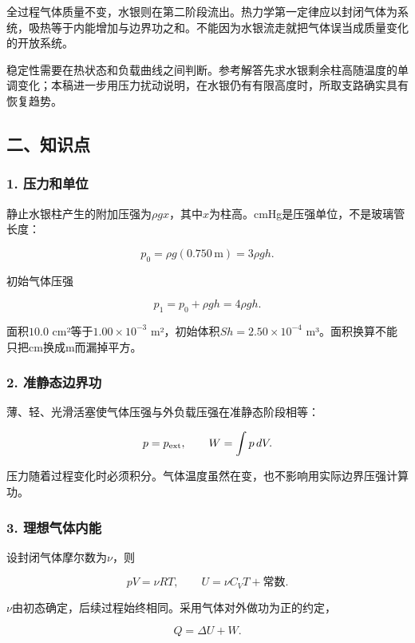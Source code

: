 \documentclass[12pt,a4paper,fontset=fandol]{ctexart}
\begin{document}
全过程气体质量不变，水银则在第二阶段流出。热力学第一定律应以封闭气体为系统，吸热等于内能增加与边界功之和。不能因为水银流走就把气体误当成质量变化的开放系统。

稳定性需要在热状态和负载曲线之间判断。参考解答先求水银剩余柱高随温度的单调变化；本稿进一步用压力扰动说明，在水银仍有有限高度时，所取支路确实具有恢复趋势。

\subsection{二、知识点}\label{ux4e8cux77e5ux8bc6ux70b9-1}

\subsubsection{1. 压力和单位}\label{ux538bux529bux548cux5355ux4f4d}

静止水银柱产生的附加压强为\(\rho g x\)，其中\(x\)为柱高。cmHg是压强单位，不是玻璃管长度：

\[
p_0=\rho g(0.750\,\mathrm m)=3\rho gh.
\]

初始气体压强

\[
p_1=p_0+\rho gh=4\rho gh.
\]

面积\(10.0\) cm²等于\(1.00\times10^{-3}\)
m²，初始体积\(Sh=2.50\times10^{-4}\)
m³。面积换算不能只把cm换成m而漏掉平方。

\subsubsection{2.
准静态边界功}\label{ux51c6ux9759ux6001ux8fb9ux754cux529f}

薄、轻、光滑活塞使气体压强与外负载压强在准静态阶段相等：

\[
p=p_{\rm ext},\qquad
W=\int p\,dV.
\]

压力随着过程变化时必须积分。气体温度虽然在变，也不影响用实际边界压强计算功。

\subsubsection{3.
理想气体内能}\label{ux7406ux60f3ux6c14ux4f53ux5185ux80fd}

设封闭气体摩尔数为\(\nu\)，则

\[
pV=\nu RT,\qquad
U=\nu C_VT+\text{常数}.
\]

\(\nu\)由初态确定，后续过程始终相同。采用气体对外做功为正的约定，

\[
Q=\Delta U+W.
\]
\end{document}
